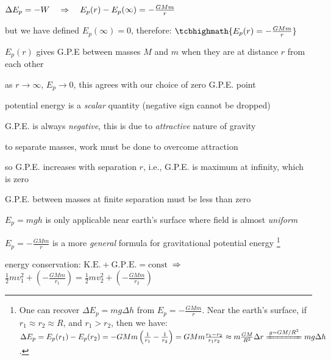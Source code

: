 $\Delta E_p = -W \quad \Rightarrow \quad E_p(r) - E_p(\infty) = - \frac{GMm}{r}$

but we have defined $E_p(\infty)=0$, therefore: $\tcbhighmath{E_p(r)= -\frac{GMm}{r}}$

$E_p(r)$ gives G.P.E between masses $M$ and $m$ when they are at distance $r$ from each other

\cmt as $r \to \infty$, $E_p \to 0$, this agrees with our choice of zero G.P.E. point

\cmt potential energy is a \emph{scalar} quantity (negative sign cannot be dropped)

\cmt G.P.E. is always \emph{negative}, this is due to \emph{attractive} nature of gravity

to separate masses, work must be done to overcome attraction

so G.P.E. increases with separation $r$, i.e., G.P.E. is maximum at infinity, which is zero

G.P.E. between masses at finite separation must be less than zero

\cmt $E_p=mgh$ is only applicable near earth's surface where field is almost \emph{uniform}

$E_p =-\frac{GMm}{r}$ is a more \emph{general} formula for gravitational potential energy
\footnote{One can recover $\Delta E_p=mg\Delta h$ from $E_p=-\frac{GMm}{r}$. Near the earth's surface, if $r_1\approx r_2\approx R$, and $r_1>r_2$, then we have: $\Delta E_p = E_p(r_1) - E_p(r_2) = -GMm\left(\frac{1}{r_1}-\frac{1}{r_2}\right) = GMm \frac{r_1-r_2}{r_1r_2} \approx m \frac{GM}{R^2} \Delta r \xlongequal{g=GM/R^2} mg\Delta h$.}




\begin{soln}
    energy conservation: $\text{K.E.} + \text{G.P.E.} = \text{const}$ $\, \Rightarrow \,$ $\frac{1}{2}mv_1^2+\left(-\frac{GMm}{r_1}\right) = \frac{1}{2}mv_2^2+\left(-\frac{GMm}{r_2}\right)$ \end{soln}

	
